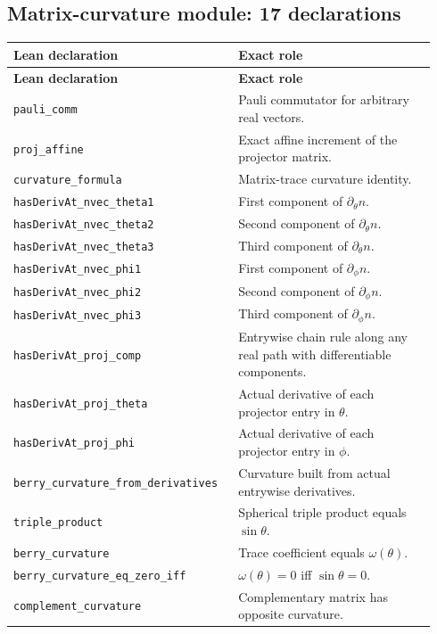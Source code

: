 \documentclass[11pt]{article}
\theoremstyle{definition}\newtheorem{definition}[theorem]{Definition}
\theoremstyle{remark}\newtheorem{remark}[theorem]{Remark}
\begin{document}
\subsection*{Matrix-curvature module: 17 declarations}
\begin{longtable}{p{0.49\linewidth}p{0.45\linewidth}}
\toprule\textbf{Lean declaration} & \textbf{Exact role}\\\midrule\endfirsthead
\toprule\textbf{Lean declaration} & \textbf{Exact role}\\\midrule\endhead
\texttt{pauli\_comm} & Pauli commutator for arbitrary real vectors.\\
\texttt{proj\_affine} & Exact affine increment of the projector matrix.\\
\texttt{curvature\_formula} & Matrix-trace curvature identity.\\
\texttt{hasDerivAt\_nvec\_theta1} & First component of $\partial_\theta n$.\\
\texttt{hasDerivAt\_nvec\_theta2} & Second component of $\partial_\theta n$.\\
\texttt{hasDerivAt\_nvec\_theta3} & Third component of $\partial_\theta n$.\\
\texttt{hasDerivAt\_nvec\_phi1} & First component of $\partial_\phi n$.\\
\texttt{hasDerivAt\_nvec\_phi2} & Second component of $\partial_\phi n$.\\
\texttt{hasDerivAt\_nvec\_phi3} & Third component of $\partial_\phi n$.\\
\texttt{hasDerivAt\_proj\_comp} & Entrywise chain rule along any real path with differentiable components.\\
\texttt{hasDerivAt\_proj\_theta} & Actual derivative of each projector entry in $\theta$.\\
\texttt{hasDerivAt\_proj\_phi} & Actual derivative of each projector entry in $\phi$.\\
\texttt{berry\_curvature\_from\_derivatives} & Curvature built from actual entrywise derivatives.\\
\texttt{triple\_product} & Spherical triple product equals $\sin\theta$.\\
\texttt{berry\_curvature} & Trace coefficient equals $\omega(\theta)$.\\
\texttt{berry\_curvature\_eq\_zero\_iff} & $\omega(\theta)=0$ iff $\sin\theta=0$.\\
\texttt{complement\_curvature} & Complementary matrix has opposite curvature.\\\bottomrule
\end{longtable}
\end{document}
